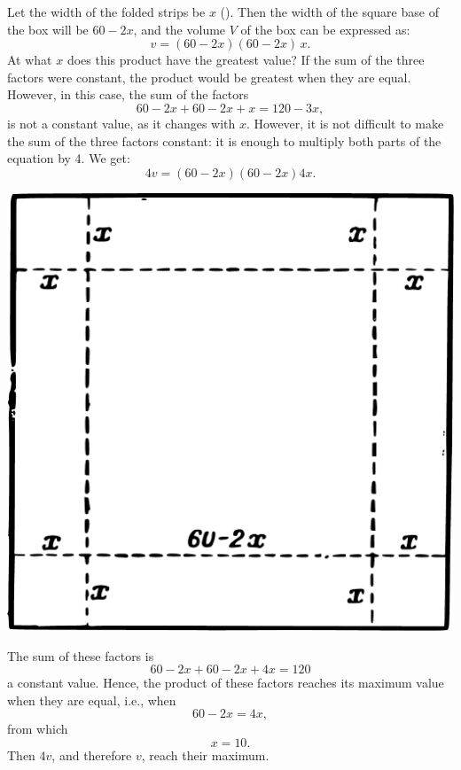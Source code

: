 \ans Let the width of the folded strips be $x$ (). Then the width of the square base of the box will be $60 - 2x$, and the volume $V$ of the box can be expressed as:
\begin{equation*}%
v = (60 - 2x)(60 - 2x)\, x.
\end{equation*}
At what $x$ does this product have the greatest value? If the sum of the three factors were constant, the product would be greatest when they are equal. However, in this case, the sum of the factors
\begin{equation*}%
60 - 2x + 60 - 2x + x = 120 - 3x,
\end{equation*}
is not a constant value, as it changes with $x$. However, it is not difficult to make the sum of the three factors constant: it is enough to multiply both parts of the equation by 4. We get:
\begin{equation*}%
4v = (60 - 2x)(60 - 2x)4x.
\end{equation*}
\begin{marginfigure}%
\centering
\includegraphics[width=\textwidth]{figures/ch-12/fig-184.pdf}
\end{marginfigure}
The sum of these factors is
\begin{equation*}%
60 - 2x + 60 - 2x + 4x = 120
\end{equation*}
a constant value. Hence, the product of these factors reaches its maximum value when they are equal, i.e., when
\begin{equation*}%
60 - 2x = 4x,
\end{equation*}
from which 
\begin{equation*}%
x = 10.
\end{equation*}
Then \(4v \), and therefore \(v \), reach their maximum.



